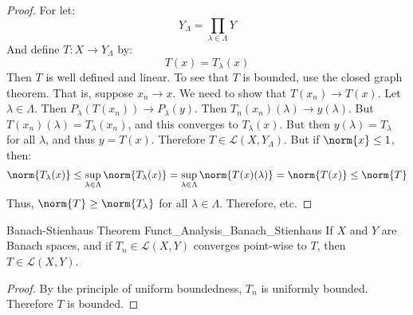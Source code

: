 \documentclass[crop=false,class=book,oneside]{standalone}                      %
\begin{document}
        \begin{proof}
            For let:
            \begin{equation}
                Y_{\Lambda}=\prod_{\lambda\in\Lambda}Y
            \end{equation}
            And define $T:X\rightarrow{Y}_{\Lambda}$ by:
            \begin{equation}
                T(x)=T_{\lambda}(x)
            \end{equation}
            Then $T$ is well defined and linear. To see
            that $T$ is bounded, use the closed graph
            theorem. That is, suppose $x_{n}\rightarrow{x}$.
            We need to show that $T(x_{n})\rightarrow{T}(x)$.
            Let $\lambda\in\Lambda$. Then
            $P_{\lambda}(T(x_{n}))\rightarrow{P}_{\lambda}(y)$.
            Then $T_{n}(x_{n})(\lambda)\rightarrow{y}(\lambda)$.
            But $T(x_{n})(\lambda)=T_{\lambda}(x_{n})$, and this
            converges to $T_{\lambda}(x)$. But then
            $y(\lambda)=T_{\lambda}$ for all $\lambda$, and
            thus $y=T(x)$. Therefore
            $T\in\mathcal{L}(X,Y_{\Lambda})$. But if
            $\norm{x}\leq{1}$, then:
            \begin{equation}
                \norm{T_{\lambda}(x)}\leq
                \sup_{\lambda\in\Lambda}\norm{T_{\lambda}(x)}
                =\sup_{\lambda\in\Lambda}\norm{T(x)(\lambda)}
                =\norm{T(x)}\leq\norm{T}
            \end{equation}
            Thus, $\norm{T}\geq\norm{T_{\lambda}}$ for all
            $\lambda\in\Lambda$. Therefore, etc.
        \end{proof}
        \begin{ltheorem}{Banach-Stienhaus Theorem}
              {Funct_Analysis_Banach_Stienhaus}
            If $X$ and $Y$ are Banach spaces, and if
            $T_{n}\in\mathcal{L}(X,Y)$ converges point-wise to
            $T$, then $T\in\mathcal{L}(X,Y)$.
        \end{ltheorem}
        \begin{proof}
            By the principle of uniform boundedness,
            $T_{n}$ is uniformly bounded. Therefore $T$ is bounded.
        \end{proof}
\end{document}
